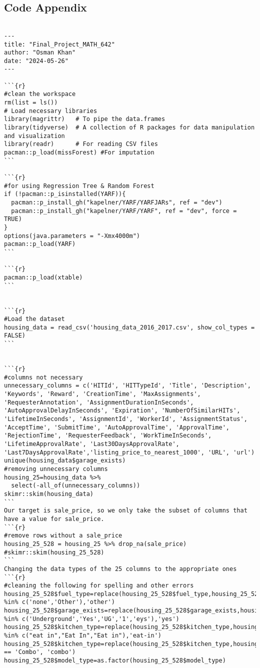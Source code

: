 \documentclass{article}
\begin{document}
\subsection*{Code Appendix}
\begin{lstlisting}

---
title: "Final_Project_MATH_642"
author: "Osman Khan"
date: "2024-05-26"
---

```{r}
#clean the workspace
rm(list = ls())
# Load necessary libraries
library(magrittr)   # To pipe the data.frames
library(tidyverse)  # A collection of R packages for data manipulation and visualization
library(readr)      # For reading CSV files
pacman::p_load(missForest) #For imputation
```

```{r}
#for using Regression Tree & Random Forest
if (!pacman::p_isinstalled(YARF)){
  pacman::p_install_gh("kapelner/YARF/YARFJARs", ref = "dev")
  pacman::p_install_gh("kapelner/YARF/YARF", ref = "dev", force = TRUE)
}
options(java.parameters = "-Xmx4000m")
pacman::p_load(YARF)
```

```{r}
pacman::p_load(xtable)
```


```{r}
#Load the dataset
housing_data = read_csv('housing_data_2016_2017.csv', show_col_types = FALSE)
```


```{r}
#columns not necessary
unnecessary_columns = c('HITId', 'HITTypeId', 'Title', 'Description', 'Keywords', 'Reward', 'CreationTime', 'MaxAssignments', 'RequesterAnnotation', 'AssignmentDurationInSeconds', 'AutoApprovalDelayInSeconds', 'Expiration', 'NumberOfSimilarHITs', 'LifetimeInSeconds', 'AssignmentId', 'WorkerId', 'AssignmentStatus', 'AcceptTime', 'SubmitTime', 'AutoApprovalTime', 'ApprovalTime', 'RejectionTime', 'RequesterFeedback', 'WorkTimeInSeconds', 'LifetimeApprovalRate', 'Last30DaysApprovalRate', 'Last7DaysApprovalRate','listing_price_to_nearest_1000', 'URL', 'url')
unique(housing_data$garage_exists)
#removing unnecessary columns
housing_25=housing_data %>% 
  select(-all_of(unnecessary_columns))
skimr::skim(housing_data)
```
Our target is sale_price, so we only take the subset of columns that have a value for sale_price.
```{r}
#remove rows without a sale_price
housing_25_528 = housing_25 %>% drop_na(sale_price)
#skimr::skim(housing_25_528)
```
Changing the data types of the 25 columns to the appropriate ones
```{r}
#cleaning the following for spelling and other errors
housing_25_528$fuel_type=replace(housing_25_528$fuel_type,housing_25_528$fuel_type %in% c('none','Other'),'other')
housing_25_528$garage_exists=replace(housing_25_528$garage_exists,housing_25_528$garage_exists %in% c('Underground','Yes','UG','1','eys'),'yes')
housing_25_528$kitchen_type=replace(housing_25_528$kitchen_type,housing_25_528$kitchen_type %in% c("eat in","Eat In","Eat in"),'eat-in')
housing_25_528$kitchen_type=replace(housing_25_528$kitchen_type,housing_25_528$kitchen_type == 'Combo', 'combo')
housing_25_528$model_type=as.factor(housing_25_528$model_type)


\end{lstlisting}
\end{document}
